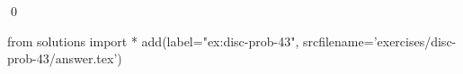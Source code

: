 
\begin{ex} 
  \label{ex:disc-prob-43}
  
  \qed
\end{ex} 
\begin{python0}
from solutions import *
add(label="ex:disc-prob-43",
    srcfilename='exercises/disc-prob-43/answer.tex') 
\end{python0}

